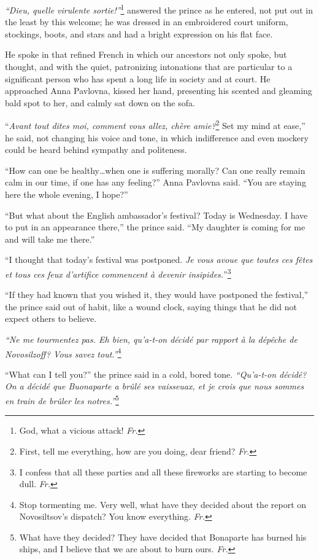 \textit{``Dieu, quelle virulente sortie!''}\footnote{God, what a vicious attack! \textit{Fr.}} answered the prince as he entered, not put out in the least by this welcome; he was dressed in an embroidered court uniform, stockings, boots, and stars and had a bright expression on his flat face.

He spoke in that refined French in which our ancestors not only spoke, but thought, and with the quiet, patronizing intonations that are particular to a significant person who has spent a long life in society and at court. He approached Anna Pavlovna, kissed her hand, presenting his scented and gleaming bald spot to her, and calmly sat down on the sofa.

``\textit{Avant tout dites moi, comment vous allez, ch\`ere amie?}\footnote{First, tell me everything, how are you doing, dear friend? \textit{Fr.}} Set my mind at ease,'' he said, not changing his voice and tone, in which indifference and even mockery could be heard behind sympathy and politeness. %

``How can one be healthy\ldots{}when one is suffering morally? Can one really remain calm in our time, if one has any feeling?'' Anna Pavlovna said. ``You are staying here the whole evening, I hope?'' %

``But what about the English ambassador's festival? Today is Wednesday. I have to put in an appearance there,'' the prince said. ``My daughter is coming for me and will take me there.'' %

``I thought that today's festival was postponed. \textit{Je vous avoue que toutes ces f\^etes et tous ces feux d'artifice commencent \`a devenir insipides.}''\footnote{I confess that all these parties and all these fireworks are starting to become dull. \textit{Fr.}} %

``If they had known that you wished it, they would have postponed the festival,'' the prince said out of habit, like a wound clock, saying things that he did not expect others to believe. %

\textit{``Ne me tourmentez pas. Eh bien, qu'a-t-on d\'ecid\'e par rapport \`a la d\'ep\^eche de Novosilzoff? Vous savez tout.''}\footnote{Stop tormenting me. Very well, what have they decided about the report on Novosiltsov's dispatch? You know everything. \textit{Fr.}} %

``What can I tell you?'' the prince said in a cold, bored
tone. \textit{``Qu'a-t-on d\'ecid\'e? On a d\'ecid\'e que Buonaparte a br\^ul\'e ses vaisseuax, et je crois que nous sommes en train de br\^uler les notres.''}\footnote{What have they decided? They have decided that Bonaparte has burned his ships, and I believe that we are about to burn ours. \textit{Fr.}} %

